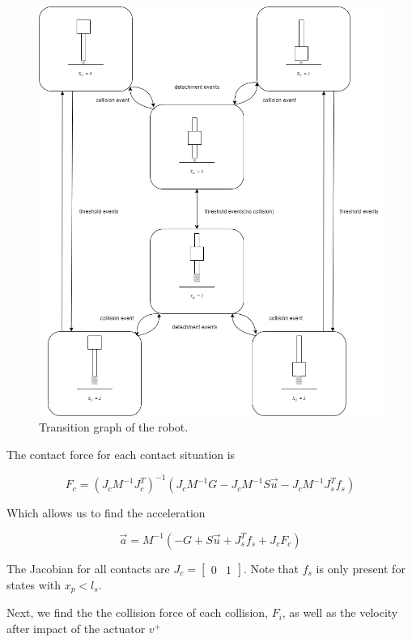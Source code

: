 \documentclass[12pt, a4paper]{report}
\begin{document}
\begin{figure}[h]
	\vspace{1pt}
	\centering
	\includegraphics[scale=0.6]{images/transitiongraph.png} 
	\caption{Transition graph of the robot.}
	\label{fig:contactdiagram}
\end{figure}
\FloatBarrier

The contact force for each contact situation is 

\begin{equation}
	F_{c} = (J_{c}M^{-1}J_{c}^{T})^{-1}(J_{c}M^{-1}G - J_{c}M^{-1}S\vec{u} - J_{c}M^{-1}J_{s}^{T}f_{s})
\end{equation}

Which allows us to find the acceleration

\begin{equation}
	\vec{a} = M^{-1}(-G+S\vec{u} + J_{s}^{T}f_{s} + J_{c}F_{c})
\end{equation}

The Jacobian for all contacts are $J_{c} = \begin{bmatrix}
0 & 1
\end{bmatrix}$. Note that $f_{s}$ is only present for states with $x_{p}<l_{s}$.\par 
Next, we find the the collision force of each collision, $F_{i}$, as well as the velocity after impact of the actuator $v^{+}$
\end{document}
